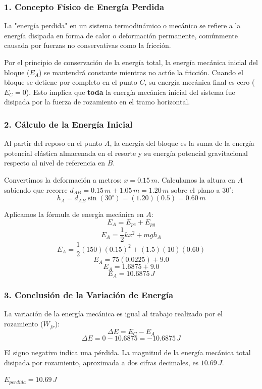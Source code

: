 \documentclass[12pt, a4paper]{article}
\begin{document}
\subsubsection*{1. Concepto Físico de Energía Perdida}
La "energía perdida" en un sistema termodinámico o mecánico se refiere a la energía disipada en forma de calor o deformación permanente, comúnmente causada por fuerzas no conservativas como la fricción. 

Por el principio de conservación de la energía total, la energía mecánica inicial del bloque ($E_A$) se mantendrá constante mientras no actúe la fricción. Cuando el bloque se detiene por completo en el punto $C$, su energía mecánica final es cero ($E_C = 0$). Esto implica que \textbf{toda} la energía mecánica inicial del sistema fue disipada por la fuerza de rozamiento en el tramo horizontal.

\subsubsection*{2. Cálculo de la Energía Inicial}
Al partir del reposo en el punto $A$, la energía del bloque es la suma de la energía potencial elástica almacenada en el resorte y su energía potencial gravitacional respecto al nivel de referencia en $B$.

Convertimos la deformación a metros: $x = 0.15 \, \si{m}$.
Calculamos la altura en $A$ sabiendo que recorre $d_{AB} = 0.15 \, \si{m} + 1.05 \, \si{m} = 1.20 \, \si{m}$ sobre el plano a $30^\circ$:
$$ h_A = d_{AB} \sin(30^\circ) = (1.20)(0.5) = 0.60 \, \si{m} $$

Aplicamos la fórmula de energía mecánica en $A$:
$$ E_A = E_{pe} + E_{pg} $$
$$ E_A = \frac{1}{2} k x^2 + m g h_A $$
$$ E_A = \frac{1}{2} (150) (0.15)^2 + (1.5)(10)(0.60) $$
$$ E_A = 75 (0.0225) + 9.0 $$
$$ E_A = 1.6875 + 9.0 $$
$$ E_A = 10.6875 \, \si{J} $$

\subsubsection*{3. Conclusión de la Variación de Energía}
La variación de la energía mecánica es igual al trabajo realizado por el rozamiento ($W_{fr}$):
$$ \Delta E = E_C - E_A $$
$$ \Delta E = 0 - 10.6875 = -10.6875 \, \si{J} $$

El signo negativo indica una pérdida. La magnitud de la energía mecánica total disipada por rozamiento, aproximada a dos cifras decimales, es $10.69 \, \si{J}$.

\begin{tcolorbox}[colback=green!5!white, colframe=green!50!black, title=Respuesta Final]
\centering \Large $E_{perdida} = 10.69 \, \si{J}$
\end{tcolorbox}
\end{document}
